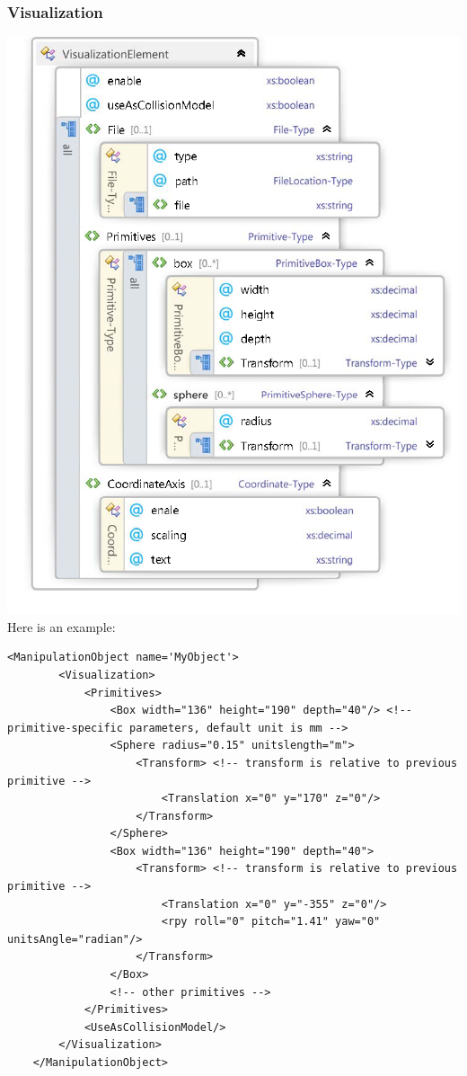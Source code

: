 \subsubsection*{Visualization}
\includegraphics[width=\textwidth]{Visualization} 
Here is an example:
\begin{lstlisting}
<ManipulationObject name='MyObject'>
        <Visualization>
            <Primitives>
                <Box width="136" height="190" depth="40"/> <!-- primitive-specific parameters, default unit is mm -->
                <Sphere radius="0.15" unitslength="m">
                    <Transform> <!-- transform is relative to previous primitive -->
                        <Translation x="0" y="170" z="0"/>
                    </Transform>
                </Sphere>
                <Box width="136" height="190" depth="40">
                    <Transform> <!-- transform is relative to previous primitive -->
                        <Translation x="0" y="-355" z="0"/>
                        <rpy roll="0" pitch="1.41" yaw="0" unitsAngle="radian"/>
                    </Transform>
                </Box>
                <!-- other primitives -->
            </Primitives>
            <UseAsCollisionModel/>
        </Visualization>
    </ManipulationObject>
\end{lstlisting}
